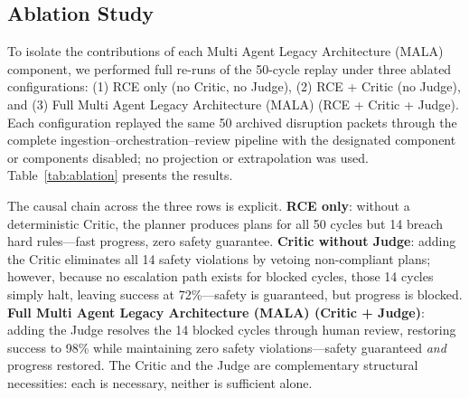 \documentclass[conference]{IEEEtran}
\newcommand{\MALA}{Multi Agent Legacy Architecture (MALA)}
\begin{document}
\begin{table}[!t]
\sffamily
\caption{Threshold Sensitivity of \MALA{} on the Same 50 Cycles}\label{tab:sensitivity}
\centering
\small
{}
\end{table}


\subsection{Ablation Study}

To isolate the contributions of each \MALA{} component, we performed full re-runs of the 50-cycle replay under three ablated configurations: (1) RCE only (no Critic, no Judge), (2) RCE + Critic (no Judge), and (3) Full \MALA{} (RCE + Critic + Judge). Each configuration replayed the same 50 archived disruption packets through the complete ingestion--orchestration--review pipeline with the designated component or components disabled; no projection or extrapolation was used. Table~\ref{tab:ablation} presents the results.

The causal chain across the three rows is explicit. \textbf{RCE only}: without a deterministic Critic, the planner produces plans for all 50 cycles but 14 breach hard rules---fast progress, zero safety guarantee. \textbf{Critic without Judge}: adding the Critic eliminates all 14 safety violations by vetoing non-compliant plans; however, because no escalation path exists for blocked cycles, those 14 cycles simply halt, leaving success at 72\%---safety is guaranteed, but progress is blocked. \textbf{Full \MALA{} (Critic + Judge)}: adding the Judge resolves the 14 blocked cycles through human review, restoring success to 98\% while maintaining zero safety violations---safety guaranteed \emph{and} progress restored. The Critic and the Judge are complementary structural necessities: each is necessary, neither is sufficient alone.
\end{document}
